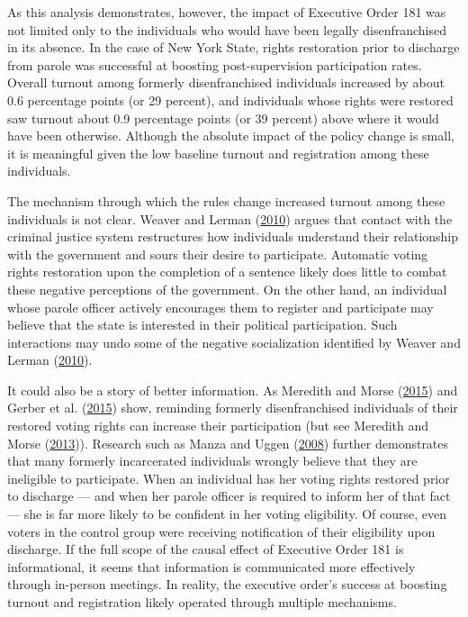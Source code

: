 \documentclass[
  12pt,
]{article}
\begin{document}
As this analysis demonstrates, however, the impact of Executive Order 181 was not limited only to the individuals who would have been legally disenfranchised in its absence. In the case of New York State, rights restoration prior to discharge from parole was successful at boosting post-supervision participation rates. Overall turnout among formerly disenfranchised individuals increased by about 0.6 percentage points (or 29 percent), and individuals whose rights were restored saw turnout about 0.9 percentage points (or 39 percent) above where it would have been otherwise. Although the absolute impact of the policy change is small, it is meaningful given the low baseline turnout and registration among these individuals.

The mechanism through which the rules change increased turnout among these individuals is not clear. Weaver and Lerman (\protect\hyperlink{ref-Weaver2010}{2010}) argues that contact with the criminal justice system restructures how individuals understand their relationship with the government and sours their desire to participate. Automatic voting rights restoration upon the completion of a sentence likely does little to combat these negative perceptions of the government. On the other hand, an individual whose parole officer actively encourages them to register and participate may believe that the state is interested in their political participation. Such interactions may undo some of the negative socialization identified by Weaver and Lerman (\protect\hyperlink{ref-Weaver2010}{2010}).

It could also be a story of better information. As Meredith and Morse (\protect\hyperlink{ref-Meredith2015}{2015}) and Gerber et al. (\protect\hyperlink{ref-Gerber2015}{2015}) show, reminding formerly disenfranchised individuals of their restored voting rights can increase their participation (but see Meredith and Morse (\protect\hyperlink{ref-Meredith2013}{2013})). Research such as Manza and Uggen (\protect\hyperlink{ref-locked_out}{2008}) further demonstrates that many formerly incarcerated individuals wrongly believe that they are ineligible to participate. When an individual has her voting rights restored prior to discharge --- and when her parole officer is required to inform her of that fact --- she is far more likely to be confident in her voting eligibility. Of course, even voters in the control group were receiving notification of their eligibility upon discharge. If the full scope of the causal effect of Executive Order 181 is informational, it seems that information is communicated more effectively through in-person meetings. In reality, the executive order's success at boosting turnout and registration likely operated through multiple mechanisms.
\end{document}
